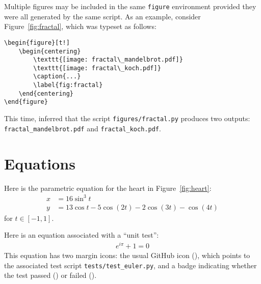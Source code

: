 \documentclass[modern]{aastex62}
\begin{document}
Multiple figures may be included in the same \lstinline[style=LaTeX]!figure! environment provided they were all generated by the same script. As an example, consider Figure~\ref{fig:fractal}, which was typeset as follows:
%
\begin{lstlisting}[style=LaTeX]
\begin{figure}[t!]
    \begin{centering}
        \texttt{[image: fractal\_mandelbrot.pdf]}
        \texttt{[image: fractal\_koch.pdf]}
        \caption{...}
        \label{fig:fractal}
    \end{centering}
\end{figure}
\end{lstlisting}
%
This time, \showyourwork inferred that the script \texttt{figures/fractal.py} produces two outputs: \texttt{fractal\_mandelbrot.pdf} and
\texttt{fractal\_koch.pdf}.


\section{Equations}

Here is the parametric equation for the heart in Figure~\ref{fig:heart}:
%
\begin{align}
    \label{eq*:heart}
    x & = 16 \sin^3 t                          \nonumber \\
    y & = 13 \cos t - 5 \cos\left(2 t\right) -
    2 \cos\left(3 t\right) - \cos\left(4 t\right)
\end{align}
%
for $t \in [-1, 1]$.

Here is an equation associated with a ``unit test'':
%
\begin{align}
    \label{eq:euler}
    e^{i\pi} + 1 = 0
\end{align}
%
This equation has two margin icons: the usual GitHub icon (\GitHubIcon), which points to the associated test script \texttt{tests/test\_euler.py}, and a badge indicating whether the test passed
(\TestPassIcon) or failed (\TestFailIcon).

\clearpage

\end{document}
